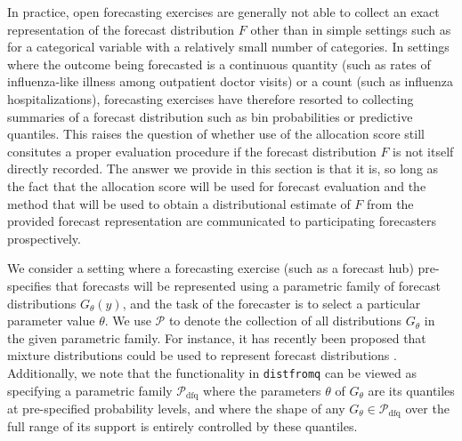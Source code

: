 \documentclass{article}
\begin{document}
In practice, open forecasting exercises are generally not able to collect an exact representation of the forecast distribution $F$ other than in simple settings such as for a categorical variable with a relatively small number of categories. In settings where the outcome being forecasted is a continuous quantity (such as rates of influenza-like illness among outpatient doctor visits) or a count (such as influenza hospitalizations), forecasting exercises have therefore resorted to collecting summaries of a forecast distribution such as bin probabilities or predictive quantiles. This raises the question of whether use of the allocation score still consitutes a proper evaluation procedure if the forecast distribution $F$ is not itself directly recorded. The answer we provide in this section is that it is, so long as the fact that the allocation score will be used for forecast evaluation and the method that will be used to obtain a distributional estimate of $F$ from the provided forecast representation are communicated to participating forecasters prospectively.

We consider a setting where a forecasting exercise (such as a forecast hub) pre-specifies that forecasts will be represented using a parametric family of forecast distributions $G_\theta(y)$, and the task of the forecaster is to select a particular parameter value $\theta$. We use $\mathcal{P}$ to denote the collection of all distributions $G_\theta$ in the given parametric family. For instance, it has recently been proposed that mixture distributions could be used to represent forecast distributions \cite{wadsworth2023mixture}. Additionally, we note that the functionality in \verb`distfromq` can be viewed as specifying a parametric family $\mathcal{P}_{\mathrm{dfq}}$ where the parameters $\theta$ of $G_\theta$
are its quantiles at pre-specified probability levels, and where the shape of any $G_\theta \in \mathcal{P}_{\mathrm{dfq}}$ over the full range of its support is entirely controlled by these quantiles.
\end{document}
